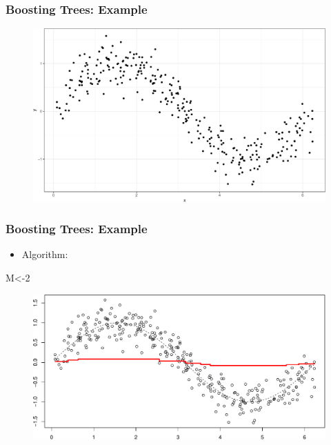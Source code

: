 \documentclass[
  shownotes,
  xcolor={svgnames},
  hyperref={colorlinks,citecolor=DarkBlue,linkcolor=DarkRed,urlcolor=DarkBlue}
  , aspectratio=169]{beamer}
\newenvironment{Shaded}{\begin{snugshade}}{\end{snugshade}}
\newcommand{\DecValTok}[1]{\textcolor[rgb]{0.00,0.00,0.81}{#1}}
\newcommand{\NormalTok}[1]{#1}
\begin{document}
\begin{frame}[fragile]
\frametitle{Boosting Trees: Example}
\begin{figure}[H] \centering
            \captionsetup{justification=centering}
              \includegraphics[scale=0.5]{figures/unnamed-chunk-3-1.pdf}
 \end{figure}


 \end{frame}
\begin{frame}
\frametitle{Boosting Trees: Example}

\begin{itemize}
\item Algorithm:
\end{itemize}

\begin{Shaded}
\begin{Highlighting}[]
\NormalTok{M\textless{}{-}}\DecValTok{2}
\end{Highlighting}
\end{Shaded}

\begin{figure}[H] \centering
            \captionsetup{justification=centering}
              \includegraphics[scale=0.5]{figures/unnamed-chunk-5-1.pdf}
 \end{figure}

 \end{frame}
\end{document}
